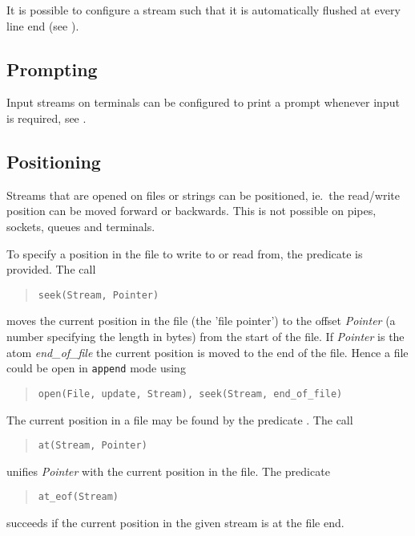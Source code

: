 It is possible to configure a stream such that it is automatically
flushed at every line end (see 
).


\subsection{Prompting}
Input streams on terminals can be configured to print a prompt
whenever input is required, see 
.


\subsection{Positioning}
Streams that are opened on files or strings can be positioned,
ie.\ the read/write position can be moved forward or backwards.
This is not possible on pipes, sockets, queues and terminals.

To specify a position in the file
to write to or read from, the predicate  is provided. The
call \begin{quote}\begin{verbatim}
seek(Stream, Pointer)\end{verbatim}\end{quote} moves the current position in the
file (the 'file pointer') to the offset {\it Pointer} (a number specifying
the length in bytes) from
the start of the file.
If {\it Pointer} is the atom {\it end_of_file} the
current position is moved to the end of the file.
Hence a file could be open in {\tt append} mode using
\begin{quote}\begin{verbatim}
open(File, update, Stream), seek(Stream, end_of_file)\end{verbatim}\end{quote}
The current position in a file may be found by the predicate .
The call \begin{quote}\begin{verbatim}
at(Stream, Pointer)\end{verbatim}\end{quote} unifies {\it Pointer} with the current
position in the file.
The predicate
\begin{quote}\begin{verbatim}
at_eof(Stream)\end{verbatim}\end{quote}
succeeds if the current position in the given stream
is at the file end.


